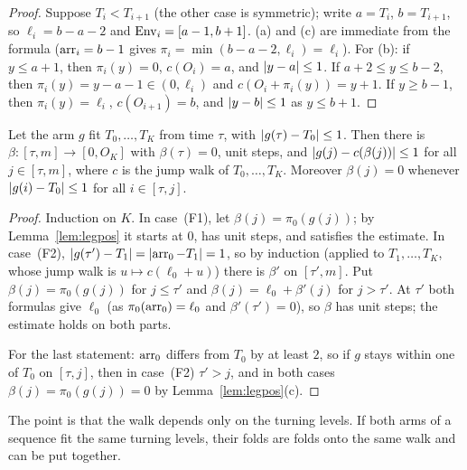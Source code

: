 \begin{proof}
Suppose $T_i<T_{i+1}$ (the other case is symmetric); write $a=T_i$, $b=T_{i+1}$, so $\ell_i=b-a-2$ and $\operatorname{Env}_i=[a-1,b+1]$.
(a) and (c) are immediate from the formula ($\operatorname{arr}_i=b-1$ gives $\pi_i=\min(b-a-2,\ell_i)=\ell_i$). For (b): if $y\le a+1$,
then $\pi_i(y)=0$, $c(O_i)=a$, and $\left\lvert y-a\right\rvert\le1$. If $a+2\le y\le b-2$, then $\pi_i(y)=y-a-1\in(0,\ell_i)$ and
$c(O_i+\pi_i(y))=y+1$. If $y\ge b-1$, then $\pi_i(y)=\ell_i$, $c(O_{i+1})=b$, and $\left\lvert y-b\right\rvert\le1$ as $y\le b+1$.
\end{proof}


\begin{lemma}\label{lem:fold-of-fit}
Let the arm $g$ fit $T_0,\dots,T_K$ from time $\tau$, with $\left\lvert g(\tau)-T_0\right\rvert\le1$. Then there is $\beta\colon[\tau,m]\to[0,O_K]$ with
$\beta(\tau)=0$, unit steps, and $\left\lvert g(j)-c(\beta(j))\right\rvert\le1$ for all $j\in[\tau,m]$, where $c$ is the jump walk of $T_0,\dots,T_K$.
Moreover $\beta(j)=0$ whenever $\left\lvert g(i)-T_0\right\rvert\le1$ for all $i\in[\tau,j]$.
\end{lemma}

\begin{proof}
Induction on $K$. In case~(F1), let $\beta(j)=\pi_0(g(j))$; by Lemma~\ref{lem:legpos} it starts at $0$, has unit steps, and
satisfies the estimate. In case~(F2), $\left\lvert g(\tau')-T_1\right\rvert=\left\lvert \operatorname{arr}_0-T_1\right\rvert=1$, so by induction (applied to $T_1,\dots,T_K$, whose
jump walk is $u\mapsto c(\ell_0+u)$) there is $\beta'$ on $[\tau',m]$. Put $\beta(j)=\pi_0(g(j))$ for $j\le\tau'$ and
$\beta(j)=\ell_0+\beta'(j)$ for $j>\tau'$. At $\tau'$ both formulas give $\ell_0$ (as $\pi_0(\operatorname{arr}_0)=\ell_0$ and $\beta'(\tau')=0$),
so $\beta$ has unit steps; the estimate holds on both parts.

For the last statement: $\operatorname{arr}_0$ differs from $T_0$ by at least $2$, so if $g$ stays within one of $T_0$ on $[\tau,j]$, then in
case~(F2) $\tau'>j$, and in both cases $\beta(j)=\pi_0(g(j))=0$ by Lemma~\ref{lem:legpos}(c).
\end{proof}


The point is that the walk depends only on the turning levels. If both arms of a sequence fit the same turning levels, their
folds are folds onto the same walk and can be put together.

